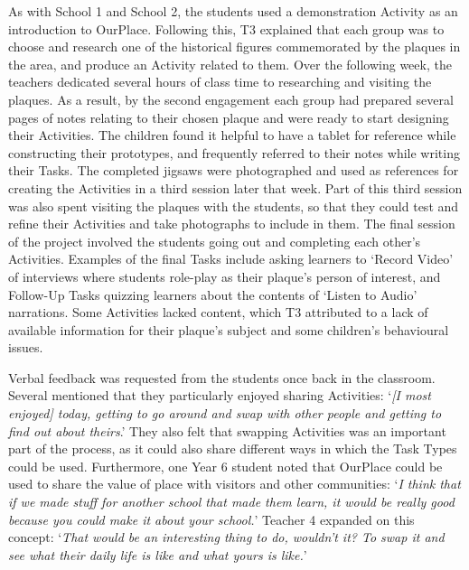 \documentclass[,hyphens]{sigchi}
\begin{document}
As with School 1 and School 2, the students used a demonstration Activity as an introduction to OurPlace. Following this, T3 explained that each group was to choose and research one of the historical figures commemorated by the plaques in the area, and produce an Activity related to them. Over the following week, the teachers dedicated several hours of class time to researching and visiting the plaques. As a result, by the second engagement each group had prepared several pages of notes relating to their chosen plaque and were ready to start designing their Activities. The children found it helpful to have a tablet for reference while constructing their prototypes, and frequently referred to their notes while writing their Tasks. The completed jigsaws were photographed and used as references for creating the Activities in a third session later that week. Part of this third session was also spent visiting the plaques with the students, so that they could test and refine their Activities and take photographs to include in them. The final session of the project involved the students going out and completing each other's Activities. Examples of the final Tasks include asking learners to `Record Video' of interviews where students role-play as their plaque's person of interest, and Follow-Up Tasks quizzing learners about the contents of `Listen to Audio' narrations. Some Activities lacked content, which T3 attributed to a lack of available information for their plaque's subject and some children's behavioural issues.

Verbal feedback was requested from the students once back in the classroom. Several mentioned that they particularly enjoyed sharing Activities: `\textit{[I most enjoyed] today, getting to go around and swap with other people and getting to find out about theirs}.' They also felt that swapping Activities was an important part of the process, as it could also share different ways in which the Task Types could be used. Furthermore, one Year 6 student noted that OurPlace could be used to share the value of place with visitors and other communities: `\textit{I think that if we made stuff for another school that made them learn, it would be really good because you could make it about your school.}' Teacher 4 expanded on this concept: `\textit{That would be an interesting thing to do, wouldn't it? To swap it and see what their daily life is like and what yours is like.}' 
\end{document}
